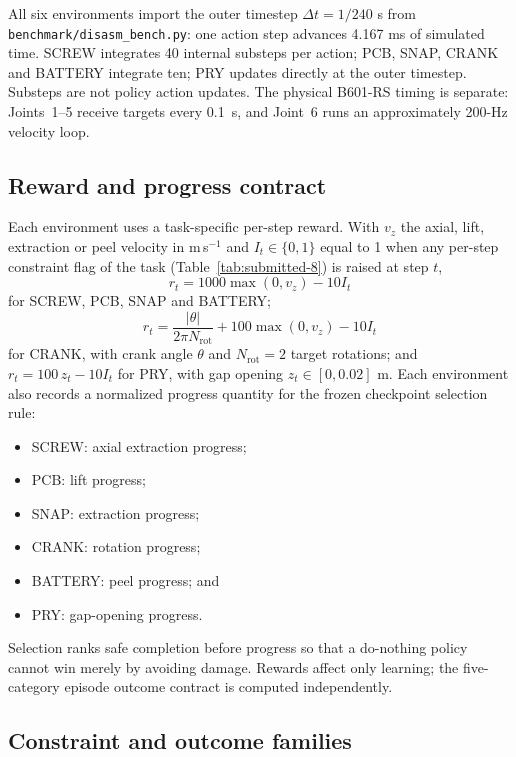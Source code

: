 \documentclass[10pt]{article}
\begin{document}
All six environments import the outer timestep\label{para:simulation-timestep}
\(\Delta t=1/240\) s from \nolinkurl{benchmark/disasm_bench.py}:
one action step advances 4.167 ms of simulated time.
SCREW integrates 40 internal substeps per action; PCB, SNAP, CRANK and
BATTERY integrate ten; PRY updates directly at the outer timestep. Substeps
are not policy action updates. The physical B601-RS timing is separate: Joints~1--5 receive targets every 0.1~s, and Joint~6 runs an approximately 200-Hz velocity loop.


\subsection{Reward and progress contract}

Each environment uses a task-specific per-step reward. With $v_z$ the axial,
lift, extraction or peel velocity in m\,s$^{-1}$ and $I_t\in\{0,1\}$ equal to
1 when any per-step constraint flag of the task (Table~\ref{tab:submitted-8})
is raised at step $t$,
\[
r_t = 1000\max(0,v_z) - 10 I_t
\]
for SCREW, PCB, SNAP and BATTERY;
\[
r_t = \frac{|\theta|}{2\pi N_{\mathrm{rot}}} + 100\max(0,v_z) - 10 I_t
\]
for CRANK, with crank angle $\theta$ and $N_{\mathrm{rot}}=2$ target rotations;
and $r_t = 100\,z_t - 10 I_t$ for PRY, with gap opening $z_t\in[0,0.02]$ m.
Each environment also records a normalized progress quantity for the
frozen checkpoint selection rule:

\begin{itemize}
\item SCREW: axial extraction progress;
\item PCB: lift progress;
\item SNAP: extraction progress;
\item CRANK: rotation progress;
\item BATTERY: peel progress; and
\item PRY: gap-opening progress.
\end{itemize}

Selection ranks safe completion before progress so that a do-nothing policy
cannot win merely by avoiding damage. Rewards affect only learning; the
five-category episode outcome contract is computed independently.


\subsection{Constraint and outcome families}
\end{document}
